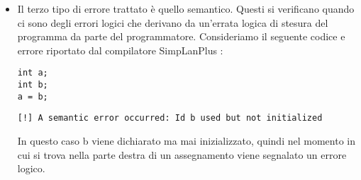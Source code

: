 \begin{itemize}
\item Il terzo tipo di errore trattato è quello semantico. Questi si verificano quando ci sono degli errori logici che derivano da un'errata logica di stesura del programma da parte del programmatore. Consideriamo il seguente codice e errore riportato dal compilatore SimpLanPlus :

\begin{verbatim}
int a;
int b;
a = b;
\end{verbatim}
\begin{verbatim}
[!] A semantic error occurred: Id b used but not initialized
\end{verbatim}
In questo caso b viene dichiarato ma mai inizializzato, quindi nel momento in cui si trova nella parte destra di un assegnamento viene segnalato un errore logico.  
\end{itemize}


